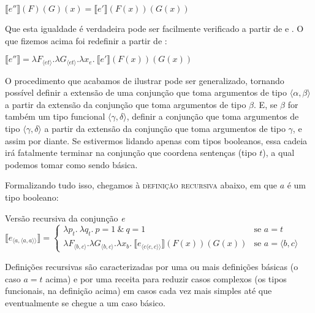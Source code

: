 \begin{exe}
	\ex $\llbracket e'' \rrbracket (F)(G)(x) = \llbracket e' \rrbracket (F(x))(G(x))$
\end{exe}

\n Que esta igualdade é verdadeira pode ser facilmente verificado
a partir de  e . O que fizemos acima foi 
redefinir  a partir de :

\begin{exe}
	\ex $\llbracket e'' \rrbracket = \lambda F_{\langle et\rangle}.\lambda G_{\langle et\rangle}.\lambda x_{e}.\ \llbracket e' \rrbracket (F(x))(G(x))$
\end{exe}

\n O procedimento que acabamos de ilustrar pode ser generalizado, tornando possível definir a
extensão de uma conjunção que toma argumentos de tipo $\langle
\alpha,\beta\rangle$ a partir da extensão da conjunção que toma
argumentos de tipo $\beta$. E, se $\beta$ for também um tipo
funcional $\langle\gamma,\delta\rangle$, definir a conjunção que
toma argumentos de tipo $\langle\gamma,\delta\rangle$ a partir da
extensão da conjunção que toma argumentos de tipo $\gamma$, e
assim por diante. Se estivermos lidando apenas com tipos
booleanos, essa cadeia irá fatalmente terminar na conjunção que
coordena sentenças (tipo $t$), a qual podemos tomar como
sendo básica.

Formalizando tudo isso, chegamos à \textsc{definição
recursiva} abaixo, em que $a$ é um tipo booleano:

\begin{exe}
	\ex Versão recursiva da conjunção \textit{e}\\
	$\llbracket e_{\langle a ,\langle
		a,a\rangle\rangle}\rrbracket =
	\begin{cases}
	\lambda p_{t}.\ \lambda q_{t}.\ p=1\ \&\ q=1\ & \text{se } a =
	t\\
	\lambda F_{\langle b,c\rangle}.\lambda G_{\langle b,c\rangle}.\lambda x_{b}.\ \llbracket
	e_{\langle c\langle c,c\rangle\rangle}\rrbracket (F(x))(G(x)) &
	\text{se } a = \langle b,c\rangle
	\end{cases}$
\end{exe}



Definições recursivas são caracterizadas por uma ou mais definições básicas (o caso $a=t$ acima) e por uma receita para reduzir casos complexos (os tipos funcionais, na definição acima) em casos cada vez mais simples até que eventualmente se chegue a um caso básico. 

